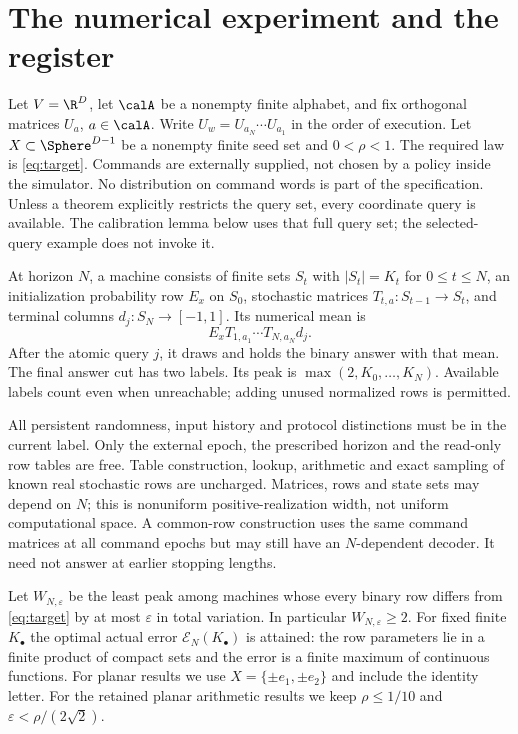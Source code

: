 \section{The numerical experiment and the register}\label{sec:model}
Let $V=\R^D$, let $\calA$ be a nonempty finite alphabet, and fix orthogonal matrices $U_a$, $a\in\calA$. Write $U_w=U_{a_N}\cdots U_{a_1}$ in the order of execution. Let $X\subset\Sphere^{D-1}$ be a nonempty finite seed set and $0<\rho<1$. The required law is \eqref{eq:target}. Commands are externally supplied, not chosen by a policy inside the simulator. No distribution on command words is part of the specification. Unless a theorem explicitly restricts the query set, every coordinate query is available. The calibration lemma below uses that full query set; the selected-query example does not invoke it.

\begin{definition}\label{def:machine}
At horizon $N$, a machine consists of finite sets $S_t$ with $|S_t|=K_t$ for $0\le t\le N$, an initialization probability row $E_x$ on $S_0$, stochastic matrices $T_{t,a}:S_{t-1}\to S_t$, and terminal columns $d_j:S_N\to[-1,1]$. Its numerical mean is
\[
 E_x T_{1,a_1}\cdots T_{N,a_N}d_j.
\]
After the atomic query $j$, it draws and holds the binary answer with that mean. The final answer cut has two labels. Its peak is $\max(2,K_0,\ldots,K_N)$. Available labels count even when unreachable; adding unused normalized rows is permitted.
\end{definition}

All persistent randomness, input history and protocol distinctions must be in the current label. Only the external epoch, the prescribed horizon and the read-only row tables are free. Table construction, lookup, arithmetic and exact sampling of known real stochastic rows are uncharged. Matrices, rows and state sets may depend on $N$; this is nonuniform positive-realization width, not uniform computational space. A common-row construction uses the same command matrices at all command epochs but may still have an $N$-dependent decoder. It need not answer at earlier stopping lengths.

Let $W_{N,\varepsilon}$ be the least peak among machines whose every binary row differs from \eqref{eq:target} by at most $\varepsilon$ in total variation. In particular $W_{N,\varepsilon}\ge2$. For fixed finite $K_\bullet$ the optimal actual error $\mathcal E_N(K_\bullet)$ is attained: the row parameters lie in a finite product of compact sets and the error is a finite maximum of continuous functions. For planar results we use $X=\{\pm e_1,\pm e_2\}$ and include the identity letter. For the retained planar arithmetic results we keep $\rho\le1/10$ and $\varepsilon<\rho/(2\sqrt2)$.

